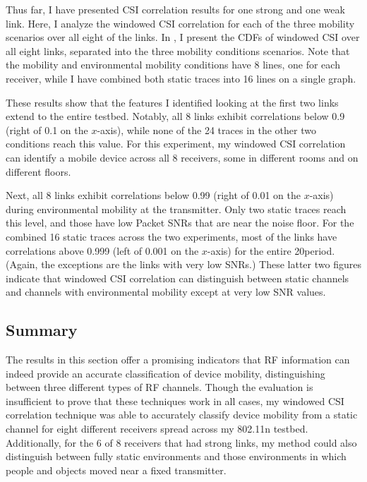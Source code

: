  Thus far, I have presented CSI correlation results for one strong and one weak link. Here, I analyze the windowed CSI correlation for each of the three mobility scenarios over all eight of the links. In , I present the CDFs of windowed CSI over all eight links, separated into the three mobility conditions scenarios. Note that the mobility and environmental mobility conditions have 8 lines, one for each receiver, while I have combined both static traces into 16 lines on a single graph.

These results show that the features I identified looking at the first two links extend to the entire testbed. Notably, all 8 links exhibit correlations below 0.9 (right of 0.1 on the $x$-axis), while none of the 24 traces in the other two conditions reach this value. For this experiment, my windowed CSI correlation can identify a mobile device across all 8 receivers, some in different rooms and on different floors.

Next, all 8 links exhibit correlations below 0.99 (right of 0.01 on the $x$-axis) during environmental mobility at the transmitter. Only two static traces reach this level, and those have low Packet SNRs that are near the noise floor. For the combined 16 static traces across the two experiments, most of the links have correlations above 0.999 (left of 0.001 on the $x$-axis) for the entire 20\s period. (Again, the exceptions are the links with very low SNRs.) These latter two figures indicate that windowed CSI correlation can distinguish between static channels and channels with environmental mobility except at very low SNR values.

\subsection{Summary}
The results in this section offer a promising indicators that RF information can indeed provide an accurate classification of device mobility, distinguishing between three different types of RF channels. Though the evaluation is insufficient to prove that these techniques work in all cases, my windowed CSI correlation technique was able to accurately classify device mobility from a static channel for eight different receivers spread across my 802.11n testbed. Additionally, for the 6 of 8 receivers that had strong links, my method could also distinguish between fully static environments and those environments in which people and objects moved near a fixed transmitter.

